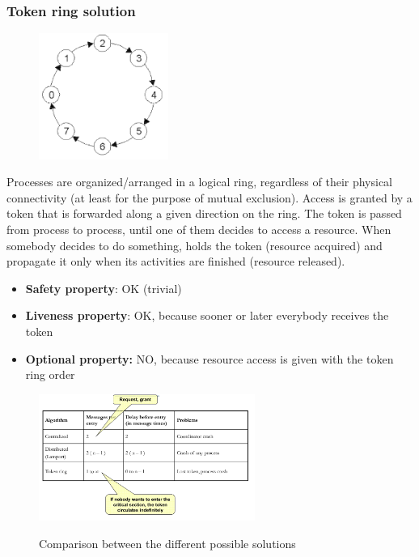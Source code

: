 \documentclass[10pt,a4paper]{article}
\begin{document}
\subsubsection{Token ring solution}
\begin{figure}[h!]
 \hfill \includegraphics[width=120pt]{images/tokenring.png}\hspace*{\fill}
  \label{fig:tokenring}
\end{figure}
Processes are organized/arranged in a logical ring, regardless of their physical connectivity (at least for the purpose of mutual exclusion). Access is granted by a token that is forwarded along a given direction on the ring. The token is passed from process to process, until one of them decides to access a resource. When somebody decides to do something, holds the token (resource acquired) and propagate it only when its activities are finished (resource released).
\begin{itemize}
 	\item \textbf{Safety property}: OK (trivial)
 	\item \textbf{Liveness property}: OK, because sooner or later everybody receives the token
 	\item \textbf{Optional property:} NO, because resource access is given with the token ring order
\end{itemize}
\begin{figure}[h!]
 \hfill \includegraphics[width=200pt]{images/comparisons.png}\hspace*{\fill}
  \label{fig:comparisons}
  \caption{Comparison between the different possible solutions}
\end{figure}
\end{document}
